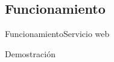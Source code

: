 %
%
%

\subsection{Funcionamiento}

\begin{frame}{Funcionamiento}{Servicio web}

  \huge
  Demostración

\end{frame}
